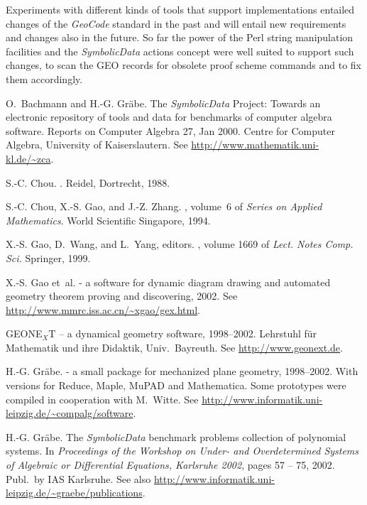 \documentclass[11pt]{article}
\newcommand{\GC}{\textit{Geo\-Code}}
\newcommand{\GP}{\textit{Geo\-Prover}}
\newcommand{\SD}{\textit{Symbolic\-Data}}
\begin{document}
Experiments with different kinds of tools that support implementations
entailed changes of the {\GC} standard in the past and will entail new
requirements and changes also in the future.  So far the power of the Perl
string manipulation facilities and the {\SD} actions concept were well suited
to support such changes, to scan the GEO records for obsolete proof scheme
commands and to fix them accordingly.

\nocite{Proceedings/ADG-96} \nocite{Proceedings/ADG-98}
\begin{thebibliography}{10}

O.~Bachmann and H.-G. Gr\"{a}be.
\newblock The {\SD} {P}roject: Towards an electronic repository of tools and
  data for benchmarks of computer algebra software.
\newblock Reports on Computer Algebra 27, Jan 2000.
\newblock Centre for Computer Algebra, University of Kaisers\-lautern. See
  \url{http://www.mathematik.uni-kl.de/~zca}.

S.-C. Chou.
.
\newblock Reidel, Dortrecht, 1988.

S.-C. Chou, X.-S. Gao, and J.-Z. Zhang.
, volume~6 of {\em Series on Applied
  Mathematics}.
\newblock World Scientific Singapore, 1994.

X.-S. Gao, D.~Wang, and L.~Yang, editors.
, volume 1669 of
  {\em Lect. Notes Comp. Sci.} Springer, 1999.

X.-S. Gao et~al.
 - a software for dynamic diagram drawing and
  automated geometry theorem proving and discovering, 2002.
\newblock See \url{http://www.mmrc.iss.ac.cn/~xgao/gex.html}.

{GEONE$_X$T} -- a dynamical geometry software, 1998--2002.
\newblock Lehrstuhl f\"ur Mathematik und ihre Didaktik, Univ.~Bayreuth. See
  \url{http://www.geonext.de}.

H.-G. Gr\"abe.
\newblock {\GP} - a small package for mechanized plane geometry, 1998--2002.
\newblock With versions for Reduce, Maple, MuPAD and Mathematica. Some
  prototypes were compiled in cooperation with M.~Witte. \newblock See
  \url{http://www.informatik.uni-leipzig.de/~compalg/software}.

H.-G. Gr\"abe.
\newblock The {\SD} benchmark problems collection of polynomial systems.
\newblock In {\em Proceedings of the Workshop on Under- and Overdetermined
  Systems of Algebraic or Differential Equations, Karlsruhe 2002}, pages 57 --
  75, 2002.
\newblock Publ.\ by IAS Karlsruhe. \newblock See also
  \url{http://www.informatik.uni-leipzig.de/~graebe/publications}.


\end{thebibliography}
\end{document}
